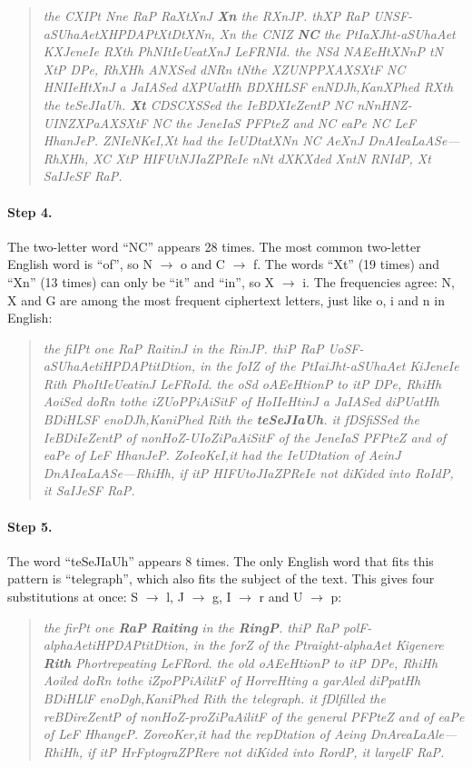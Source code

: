 \documentclass[12pt,a4paper]{article}
\newenvironment{cryptotext}{\begin{quote}\raggedright\itshape\small}{\end{quote}}
\begin{document}
\begin{cryptotext}
the CXIPt Nne RaP RaXtXnJ \textbf{Xn} the RXnJP. thXP RaP UNSF-aSUhaAetXHPDAPtXtDtXNn, Xn the CNIZ \textbf{NC} the PtIaXJht-aSUhaAet KXJeneIe RXth PhNItIeUeatXnJ LeFRNId. the NSd NAEeHtXNnP tN XtP DPe, RhXHh ANXSed dNRn tNthe XZUNPPXAXSXtF NC HNIIeHtXnJ a JaIASed dXPUatHh BDXHLSF enNDJh,KanXPhed RXth the teSeJIaUh. \textbf{Xt} CDSCXSSed the IeBDXIeZentP NC nNnHNZ-UINZXPaAXSXtF NC the JeneIaS PFPteZ and NC eaPe NC LeF HhanJeP. ZNIeNKeI,Xt had the IeUDtatXNn NC AeXnJ DnAIeaLaASe---RhXHh, XC XtP HIFUtNJIaZPReIe nNt dXKXded XntN RNIdP, Xt SaIJeSF RaP.
\end{cryptotext}

\paragraph{Step 4.} The two-letter word ``NC'' appears 28 times. The most common two-letter
English word is ``of'', so N $\rightarrow$ o and C $\rightarrow$ f. The words ``Xt'' (19 times)
and ``Xn'' (13 times) can only be ``it'' and ``in'', so X $\rightarrow$ i. The frequencies
agree: N, X and G are among the most frequent ciphertext letters, just like o, i and n in
English:

\begin{cryptotext}
the fiIPt one RaP RaitinJ in the RinJP. thiP RaP UoSF-aSUhaAetiHPDAPtitDtion, in the foIZ of the PtIaiJht-aSUhaAet KiJeneIe Rith PhoItIeUeatinJ LeFRoId. the oSd oAEeHtionP to itP DPe, RhiHh AoiSed doRn tothe iZUoPPiAiSitF of HoIIeHtinJ a JaIASed diPUatHh BDiHLSF enoDJh,KaniPhed Rith the \textbf{teSeJIaUh}. it fDSfiSSed the IeBDiIeZentP of nonHoZ-UIoZiPaAiSitF of the JeneIaS PFPteZ and of eaPe of LeF HhanJeP. ZoIeoKeI,it had the IeUDtation of AeinJ DnAIeaLaASe---RhiHh, if itP HIFUtoJIaZPReIe not diKided into RoIdP, it SaIJeSF RaP.
\end{cryptotext}

\paragraph{Step 5.} The word ``teSeJIaUh'' appears 8 times. The only English word that fits
this pattern is ``telegraph'', which also fits the subject of the text. This gives four
substitutions at once: S $\rightarrow$ l, J $\rightarrow$ g, I $\rightarrow$ r and
U $\rightarrow$ p:

\begin{cryptotext}
the firPt one \textbf{RaP} \textbf{Raiting} in the \textbf{RingP}. thiP RaP polF-alphaAetiHPDAPtitDtion, in the forZ of the Ptraight-alphaAet Kigenere \textbf{Rith} Phortrepeating LeFRord. the old oAEeHtionP to itP DPe, RhiHh Aoiled doRn tothe iZpoPPiAilitF of HorreHting a garAled diPpatHh BDiHLlF enoDgh,KaniPhed Rith the telegraph. it fDlfilled the reBDireZentP of nonHoZ-proZiPaAilitF of the general PFPteZ and of eaPe of LeF HhangeP. ZoreoKer,it had the repDtation of Aeing DnAreaLaAle---RhiHh, if itP HrFptograZPRere not diKided into RordP, it largelF RaP.
\end{cryptotext}
\end{document}
